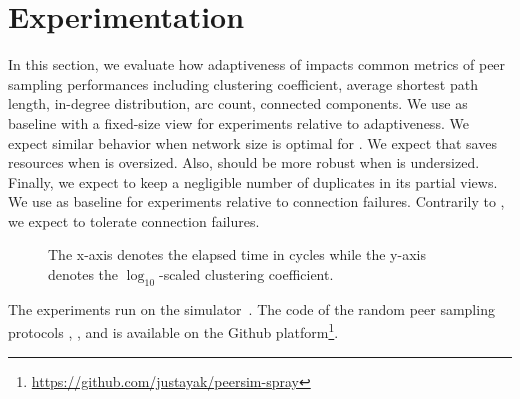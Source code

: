 \section{Experimentation}
\label{sec:experiments}

In this section, we evaluate how adaptiveness of \SPRAY impacts common metrics
of peer sampling performances including clustering coefficient, average
shortest path length, in-degree distribution, arc count, connected
components. We use \CYCLON as baseline with a fixed-size view for experiments
relative to adaptiveness. We expect similar behavior when network size is
optimal for \CYCLON. We expect that \SPRAY saves resources when \CYCLON is
oversized. Also, \SPRAY should be more robust when \CYCLON is
undersized. Finally, we expect \SPRAY to keep a negligible number of duplicates
in its partial views. We use \SCAMP as baseline for experiments relative to
connection failures. Contrarily to \SCAMP, we expect \SPRAY to tolerate
connection failures.

\begin{figure}
  \centering
  \hspace{10pt}
  \caption{\label{fig:clustering}The x-axis denotes the elapsed time in cycles
    while the y-axis denotes the $\log_{10}$-scaled clustering coefficient.}
\end{figure}


The experiments run on the \PEERSIM
simulator~\cite{montresor2009peersim}. The code of the random peer sampling
protocols \CYCLON, \SCAMP, and \SPRAY is available on the Github
platform\footnote{\url{https://github.com/justayak/peersim-spray}}.

